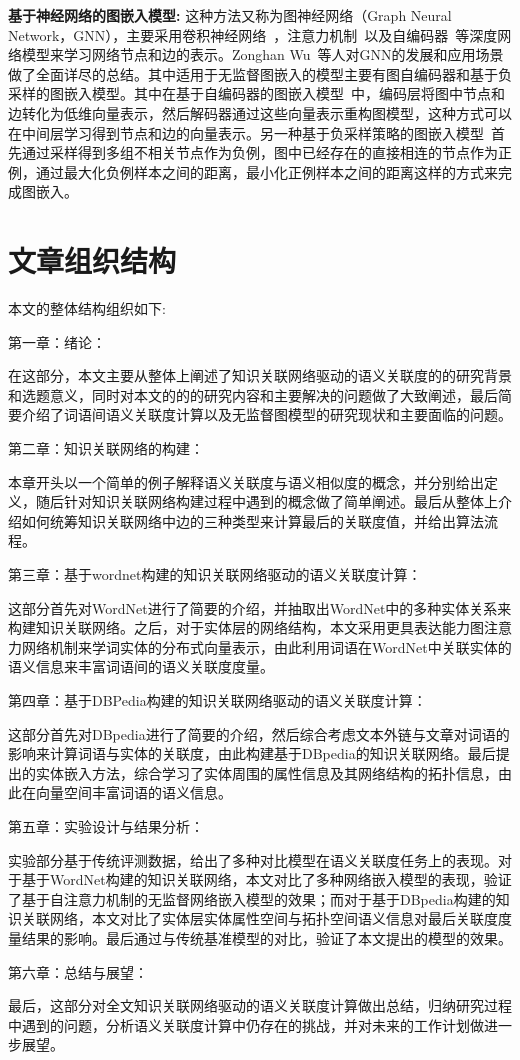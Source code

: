 \textbf{基于神经网络的图嵌入模型:}
这种方法又称为图神经网络（Graph Neural Network，GNN），主要采用卷积神经网络~\cite{MP/Yann}，注意力机制~\cite{corr/VaswaniSPUJGKP17}以及自编码器~\cite{icml/VincentLBM08}等深度网络模型来学习网络节点和边的表示。Zonghan Wu~\cite{corr/Zonghan19}等人对GNN的发展和应用场景做了全面详尽的总结。其中适用于无监督图嵌入的模型主要有图自编码器和基于负采样的图嵌入模型。其中在基于自编码器的图嵌入模型~\cite{corr/KipfW16a, ijcai/PanHLJYZ18}中，编码层将图中节点和边转化为低维向量表示，然后解码器通过这些向量表示重构图模型，这种方式可以在中间层学习得到节点和边的向量表示。另一种基于负采样策略的图嵌入模型~\cite{nips/HamiltonYL17}首先通过采样得到多组不相关节点作为负例，图中已经存在的直接相连的节点作为正例，通过最大化负例样本之间的距离，最小化正例样本之间的距离这样的方式来完成图嵌入。

\section{文章组织结构}
本文的整体结构组织如下:

第一章：绪论：

在这部分，本文主要从整体上阐述了知识关联网络驱动的语义关联度的的研究背景和选题意义，同时对本文的的的研究内容和主要解决的问题做了大致阐述，最后简要介绍了词语间语义关联度计算以及无监督图模型的研究现状和主要面临的问题。

第二章：知识关联网络的构建：

本章开头以一个简单的例子解释语义关联度与语义相似度的概念，并分别给出定义，随后针对知识关联网络构建过程中遇到的概念做了简单阐述。最后从整体上介绍如何统筹知识关联网络中边的三种类型来计算最后的关联度值，并给出算法流程。

第三章：基于wordnet构建的知识关联网络驱动的语义关联度计算：

这部分首先对WordNet进行了简要的介绍，并抽取出WordNet中的多种实体关系来构建知识关联网络。之后，对于实体层的网络结构，本文采用更具表达能力图注意力网络机制来学词实体的分布式向量表示，由此利用词语在WordNet中关联实体的语义信息来丰富词语间的语义关联度度量。


第四章：基于DBPedia构建的知识关联网络驱动的语义关联度计算：

这部分首先对DBpedia进行了简要的介绍，然后综合考虑文本外链与文章对词语的影响来计算词语与实体的关联度，由此构建基于DBpedia的知识关联网络。最后提出的实体嵌入方法，综合学习了实体周围的属性信息及其网络结构的拓扑信息，由此在向量空间丰富词语的语义信息。

第五章：实验设计与结果分析：

实验部分基于传统评测数据，给出了多种对比模型在语义关联度任务上的表现。对于基于WordNet构建的知识关联网络，本文对比了多种网络嵌入模型的表现，验证了基于自注意力机制的无监督网络嵌入模型的效果；而对于基于DBpedia构建的知识关联网络，本文对比了实体层实体属性空间与拓扑空间语义信息对最后关联度度量结果的影响。最后通过与传统基准模型的对比，验证了本文提出的模型的效果。


第六章：总结与展望：

最后，这部分对全文知识关联网络驱动的语义关联度计算做出总结，归纳研究过程中遇到的问题，分析语义关联度计算中仍存在的挑战，并对未来的工作计划做进一步展望。
